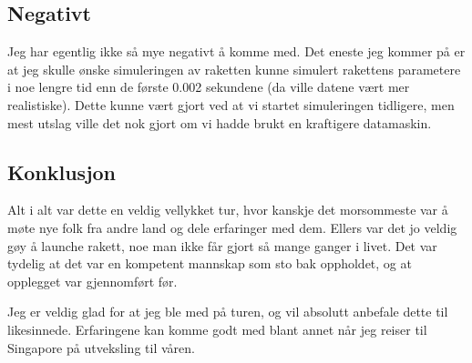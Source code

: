 \documentclass[norsk,a4paper,12pt]{article}
\begin{document}
\subsection*{Negativt}
Jeg har egentlig ikke s{\aa} mye negativt {\aa} komme med. Det eneste jeg kommer p{\aa} er at jeg skulle {\o}nske simuleringen av raketten kunne simulert rakettens parametere i noe lengre tid enn de f{\o}rste 0.002 sekundene (da ville datene v{\ae}rt mer realistiske). Dette kunne v{\ae}rt gjort ved at vi startet simuleringen tidligere, men mest utslag ville det nok gjort om vi hadde brukt en kraftigere datamaskin. 

\subsection*{Konklusjon}
Alt i alt var dette en veldig vellykket tur, hvor kanskje det morsommeste var {\aa} m{\o}te nye folk fra andre land og dele erfaringer med dem. Ellers var det jo veldig g{\o}y {\aa} launche rakett, noe man ikke f{\aa}r gjort s{\aa} mange ganger i livet. Det var tydelig at det var en kompetent mannskap som sto bak oppholdet, og at opplegget var gjennomf{\o}rt f{\o}r.\par 
Jeg er veldig glad for at jeg ble med p{\aa} turen, og vil absolutt anbefale dette til likesinnede. Erfaringene kan komme godt med blant annet n{\aa}r jeg reiser til Singapore p{\aa} utveksling til v{\aa}ren. 
\end{document}
